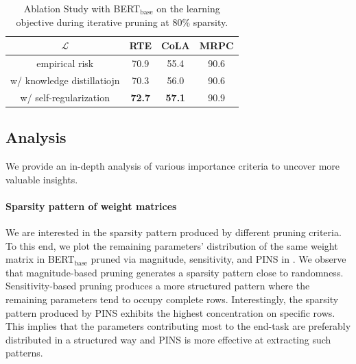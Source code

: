 \begin{table}[t]
	\centering
	\small
	\begin{tabular}{c|ccc}
		\toprule
		$\mathcal{L}$                          & RTE  & CoLA & MRPC\\
		\midrule
		empirical risk                  & 70.9 & 55.4  &90.6 \\
		w/ knowledge distillatiojn & 70.3  & 56.0 &90.6 \\
		w/ self-regularization     & \textbf{72.7} & \textbf{57.1} &90.9 \\
		\bottomrule
	\end{tabular}
\caption{Ablation Study with BERT$_{\text{base}}$ on the learning objective during iterative pruning at 80\% sparsity.}
\label{table:ablation}
\end{table}

\subsection{Analysis}
We provide an in-depth analysis of various importance criteria to uncover more valuable insights.
\paragraph{Sparsity pattern of weight matrices} We are interested in the sparsity pattern produced by different pruning criteria. To this end, we plot the remaining parameters' distribution of the same weight matrix in BERT$_{\text{base}}$ pruned via magnitude, sensitivity, and PINS in . We observe that magnitude-based pruning generates a sparsity pattern close to randomness. Sensitivity-based pruning produces a more structured pattern where the remaining parameters tend to occupy complete rows. Interestingly, the sparsity pattern produced by PINS exhibits the highest concentration on specific rows. This implies that the parameters contributing most to the end-task are preferably distributed in a structured way and PINS is more effective at extracting such patterns.



